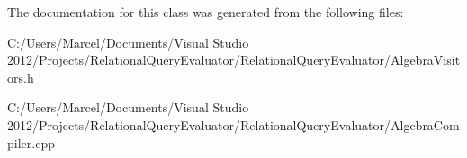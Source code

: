 The documentation for this class was generated from the following files\+:\begin{DoxyCompactItemize}
\item 
C\+:/\+Users/\+Marcel/\+Documents/\+Visual Studio 2012/\+Projects/\+Relational\+Query\+Evaluator/\+Relational\+Query\+Evaluator/Algebra\+Visitors.\+h\item 
C\+:/\+Users/\+Marcel/\+Documents/\+Visual Studio 2012/\+Projects/\+Relational\+Query\+Evaluator/\+Relational\+Query\+Evaluator/Algebra\+Compiler.\+cpp\end{DoxyCompactItemize}
